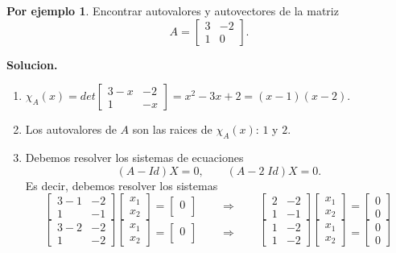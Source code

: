 \documentclass{article}
\theoremstyle{definition}
\theoremstyle{definition}
\newtheorem*{ej}{Por ejemplo}
\theoremstyle{remark}
\begin{document}
\begin{ej}
  Encontrar autovalores y autovectores de la matriz \[
    A=\begin{bmatrix} 3 & -2 \\ 1 & 0 \end{bmatrix}.
  \]
\end{ej}
\textbf{Solucion.} 
\begin{enumerate}[label=\arabic*.]
  \item $\chi_A(x)=det\begin{bmatrix} 3 - x & -2 \\ 1 & -x \end{bmatrix} = x^2-3x+2=(x-1)(x-2)$.
  \item Los autovalores de $A$ son las raices de $\chi_A(x)$: $1$ y $2$.
  \item Debemos resolver los sistemas de ecuaciones \[
      (A-Id)X=0, \quad \quad (A-2 \; Id)X=0.
    \]
    Es decir, debemos resolver los sistemas \begin{equation}\tag{S1}
      \begin{bmatrix} 3 - 1 & -2 \\ 1 & -1 \end{bmatrix} \begin{bmatrix} x_1 \\ x_2 \end{bmatrix} = \begin{bmatrix} 0 \\ \end{bmatrix} \quad \quad \Rightarrow \quad \quad \begin{bmatrix}2 & -2 \\ 1 & -1 \end{bmatrix} \begin{bmatrix}x_1 \\ x_2 \end{bmatrix} = \begin{bmatrix} 0 \\ 0 \end{bmatrix} 
    \end{equation}
\begin{equation}\tag{S2}
      \begin{bmatrix} 3 - 2 & -2 \\ 1 & -2 \end{bmatrix} \begin{bmatrix} x_1 \\ x_2 \end{bmatrix} = \begin{bmatrix} 0 \\ \end{bmatrix} \quad \quad \Rightarrow \quad \quad \begin{bmatrix}1 & -2 \\ 1 & -2 \end{bmatrix} \begin{bmatrix}x_1 \\ x_2 \end{bmatrix} = \begin{bmatrix} 0 \\ 0 \end{bmatrix} 

\end{equation}
\end{enumerate}
\end{document}
